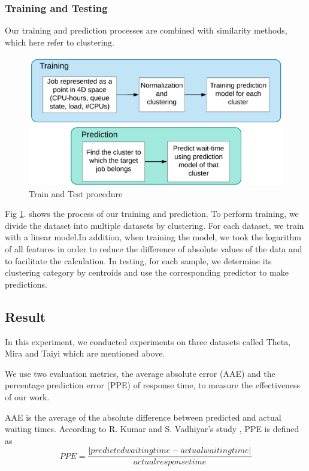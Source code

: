 \documentclass[conference,compsoc]{IEEEtran}
\begin{document}
\subsubsection{Training and Testing}
Our training and prediction processes are combined with similarity methods, which here refer to clustering.
\begin{figure}[htbp]
	\centering
	\includegraphics[width=\linewidth,scale=1.00]{train.png}
	\caption{Train and Test procedure}
	\label{train.png}
\end{figure}

Fig \ref{train.png}. shows the process of our training and prediction. To perform training, we divide the dataset into multiple datasets by clustering. For each dataset, we train with a linear model.In addition, when training the model, we took the logarithm of all features in order to reduce the difference of absolute values of the data and to facilitate the calculation. In testing, for each sample, we determine its clustering category by centroids and use the corresponding predictor to make predictions. 

\subsection{Result}
In this experiment, we conducted experiments on three datasets called Theta, Mira and Taiyi which are mentioned above.

We use two evaluation metrics, the average absolute error (AAE) and the percentage prediction error (PPE) of response time, to measure the effectiveness of our work. 

AAE is the average of the absolute difference between predicted and actual waiting times. According to R. Kumar and S. Vadhiyar's study \cite{kumarandvadhiyar}, PPE is defined as
$$
PPE=\frac{\left | predicted waiting time- actual waiting time \right |}{actual response time} 
$$
\end{document}
